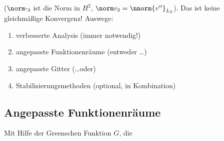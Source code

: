 ($\norm \cdot_{2}$ ist die Norm in $H^2$, $\norm v_{2} = \nnorm {v''}_{L_{2}}$). 
Das ist keine gleichmäßige Konvergenz! Auswege:
\begin{enumerate}
\item verbesserte Analysis (immer notwendig!)
\item angepasste Funktionenräume (entweder \dots)
\item angepasste Gitter (\dots oder)
\item Stabilisierungsmethoden (optional, in Kombination)
\end{enumerate}

\subsection{Angepasste Funktionenräume}
\label{sec:angep-funkt}

Mit Hilfe der Greenschen Funktion $G$, die 
